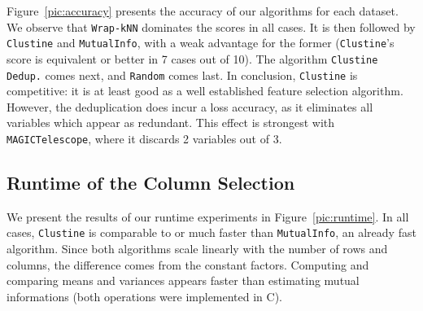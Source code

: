 Figure~\ref{pic:accuracy} presents the accuracy of our algorithms for each
dataset. We observe that \texttt{Wrap-kNN} dominates the scores in all cases.
It is then followed by \texttt{Clustine} and \texttt{MutualInfo}, with a weak
advantage for the former (\texttt{Clustine}'s score is equivalent or better in
7 cases out of 10). The algorithm \texttt{Clustine Dedup.} comes next, and
\texttt{Random} comes last. In conclusion, \texttt{Clustine} is competitive: it
is at least good as a well established feature selection algorithm. However,
the deduplication does incur a loss accuracy, as it eliminates all variables
which appear as redundant. This effect is strongest with
\texttt{MAGICTelescope}, where it discards 2 variables out of 3.
%
%
%
%

\subsection{Runtime of the Column Selection}
\label{sec:speed}

We present the results of our runtime experiments in Figure~\ref{pic:runtime}.
In all cases, \texttt{Clustine} is comparable to or much faster than
\texttt{MutualInfo}, an already fast algorithm. Since both algorithms scale
linearly with the number of rows and columns, the difference comes from the
constant factors. Computing and comparing means and variances appears faster
than estimating mutual informations (both operations were implemented in C).

